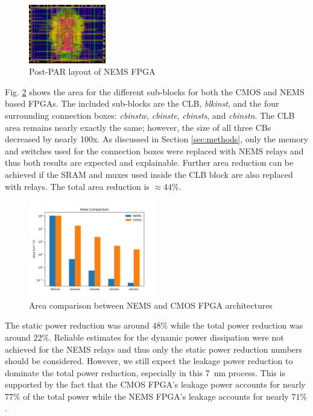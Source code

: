 \documentclass[twoside,twocolumn]{article}
\begin{document}
\begin{figure}[!hbt]
    \includegraphics[width=0.3\textwidth]{figs/nems_innovus.png}
    \centering
    \caption{Post-PAR layout of NEMS FPGA}
    \label{fig:NEMS}    
\end{figure}

Fig. \ref{fig:area} shows the area for the different sub-blocks
for both the CMOS and NEMS based FPGAs. The included sub-blocks are the CLB,
\textit{blkinst}, and the four surrounding connection boxes: \textit{cbinstw}, 
\textit{cbinste}, \textit{cbinsts}, and \textit{cbinstn}. The CLB area remains 
nearly exactly the same; however, the size of all three CBs decreased by nearly 
100x. As discussed in Section \ref{sec:methods}, only the memory and switches
used for the connection boxes were replaced with NEMS relays and thus both 
results are expected and explainable. Further area reduction can be achieved
if the SRAM and muxes used inside the CLB block are also replaced with relays.
The total area reduction is $\approx 44\%$. 

\begin{figure}[!hbt]
    \includegraphics[width=0.5\textwidth]{figs/area_comparison.png}
    \centering
    \caption{Area comparison between NEMS and CMOS FPGA architectures}
    \label{fig:area}
\end{figure}

The static power reduction was around $48\%$ while the total power reduction
was around $22\%$. Reliable estimates for the dynamic power dissipation were 
not achieved for the NEMS relays and thus only the static power reduction numbers 
should be considered. However, we still expect the leakage power reduction to dominate 
the total power reduction, especially in this \SI{7}{\nano\meter} process. This is
supported by the fact that the CMOS FPGA's leakage power accounts for nearly $77\%$ 
of the total power while the NEMS FPGA's leakage accounts for nearly $71\%$.
\end{document}
